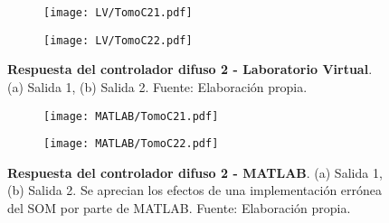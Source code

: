         \begin{figure}[htb]
            \centering
            \begin{subfigure}[t]{0.49\textwidth}
                \centering
                \texttt{[image: LV/TomoC21.pdf]}
                \caption{}
                \label{fig:respuestaC21LV}
            \end{subfigure}
            \hfill
            \begin{subfigure}[t]{0.49\textwidth}
                \centering
                \texttt{[image: LV/TomoC22.pdf]}
                \caption{}
                \label{fig:respuestaC22LV}
            \end{subfigure}
            
            \caption[Comparación - Respuesta del controlador difuso 2 - Laboratorio Virtual]{\textbf{Respuesta del controlador difuso 2 - Laboratorio Virtual}. (a) Salida 1, (b) Salida 2. Fuente: Elaboración propia. \label{fig:respuestaC2LV}}
        \end{figure}
        
        \begin{figure}[htb]
            \centering
            \begin{subfigure}[t]{0.49\textwidth}
                \centering
                \texttt{[image: MATLAB/TomoC21.pdf]}
                \caption{}
                \label{fig:respuestaC21MATLAB}
            \end{subfigure}
            \hfill
            \begin{subfigure}[t]{0.49\textwidth}
                \centering
                \texttt{[image: MATLAB/TomoC22.pdf]}
                \caption{}
                \label{fig:respuestaC22MATLAB}
            \end{subfigure}
            
            \caption[Comparación - Respuesta del controlador difuso 2 - MATLAB]{\textbf{Respuesta del controlador difuso 2 - MATLAB}. (a) Salida 1, (b) Salida 2. Se aprecian los efectos de una implementación errónea del SOM por parte de MATLAB. Fuente: Elaboración propia. \label{fig:respuestaC2MATLAB}}
        \end{figure}

